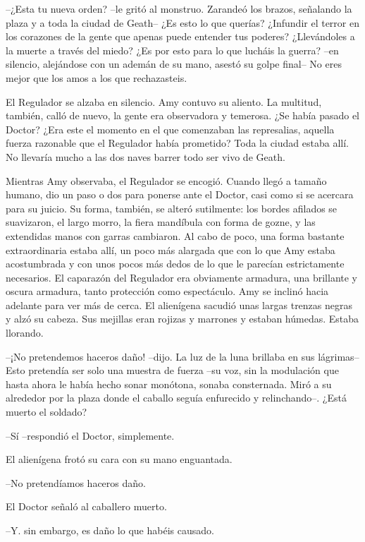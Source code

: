 {--¿Esta tu nueva orden? --le gritó al monstruo. Zarandeó los brazos,
	señalando la plaza y a toda la ciudad de Geath-- ¿Es esto lo que
	querías? ¿Infundir el terror en los corazones de la gente que apenas
	puede entender tus poderes? ¿Llevándoles a la muerte a través del miedo?
	¿Es por esto para lo que lucháis la guerra? --en silencio, alejándose
	con un ademán de su mano, asestó su golpe final-- No eres mejor que los
amos a los que rechazasteis.}

{El Regulador se alzaba en silencio. Amy contuvo su aliento. La
	multitud, también, calló de nuevo, la gente era observadora y temerosa.
	¿Se había pasado el Doctor? ¿Era este el momento en el que comenzaban
	las represalias, aquella fuerza razonable que el Regulador había
	prometido? Toda la ciudad estaba allí. No llevaría mucho a las dos naves
barrer todo ser vivo de Geath.}

{Mientras Amy observaba, el Regulador se encogió. Cuando llegó a tamaño
	humano, dio un paso o dos para ponerse ante el Doctor, casi como si se
	acercara para su juicio. Su forma, también, se alteró sutilmente: los
	bordes afilados se suavizaron, el largo morro, la fiera mandíbula con
	forma de gozne, y las extendidas manos con garras cambiaron. Al cabo de
	poco, una forma bastante extraordinaria estaba allí, un poco más
	alargada que con lo que Amy estaba acostumbrada y con unos pocos más
	dedos de lo que le parecían estrictamente necesarios. El caparazón del
	Regulador era obviamente armadura, una brillante y oscura armadura,
	tanto protección como espectáculo. Amy se inclinó hacia adelante para
	ver más de cerca. El alienígena sacudió unas largas trenzas negras y
	alzó su cabeza. Sus mejillas eran rojizas y marrones y estaban húmedas.
Estaba llorando.}

{--¡No pretendemos haceros daño! --dijo. La luz de la luna brillaba en
	sus lágrimas-- Esto pretendía ser solo una muestra de fuerza --su voz,
	sin la modulación que hasta ahora le había hecho sonar monótona, sonaba
	consternada. Miró a su alrededor por la plaza donde el caballo seguía
enfurecido y relinchando--. ¿Está muerto el soldado?}

{--Sí --respondió el Doctor, simplemente.}

{El alienígena frotó su cara con su mano enguantada.}

{--No pretendíamos haceros daño.}

{El Doctor señaló al caballero muerto.}

{--Y. sin embargo, es daño lo que habéis causado.}

